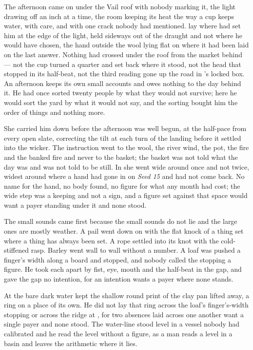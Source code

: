 The afternoon came on under the Vail roof with nobody marking it, the light drawing off  an inch at a time, the room keeping its heat the way a cup keeps water, with care, and with one crack nobody had mentioned.  lay where  had set him at the edge of the light, held sideways out of the draught and not where he would have chosen, the hand outside the wool lying flat on  where it had been laid on the last answer. Nothing had crossed under the roof from the market behind --- not the cup turned a quarter and set back where it stood, not the head that stopped in its half-beat, not the third reading gone up the road in 's locked box. An afternoon keeps its own small accounts and owes nothing to the day behind it. He had once sorted twenty people by what they would not survive; here he would sort the yard by what it would not say, and the sorting bought him the order of things and nothing more.

She carried him down before the afternoon was well begun,  at the half-pace from every open slate, correcting the tilt at each turn of the landing before it settled into the wicker. The instruction went to the wool, the river wind, the pot, the fire and the banked fire and never to the basket; the basket was not told what the day was and was not told to be still. In  she went wide around  once and not twice, widest around  where a hand had gone in on \emph{Seed 15} and had not come back. No name for the hand, no body found, no figure for what any month had cost; the wide step was a keeping and not a sign, and a figure set against that space would want a payer standing under it and none stood.

The small sounds came first because the small sounds do not lie and the large ones are mostly weather. A pail went down on  with the flat knock of a thing set where a thing has always been set. A rope settled into its knot with the cold-stiffened rasp. Barley went wall to wall without a number. A loaf was pushed a finger's width along a board and stopped, and nobody called the stopping a figure. He took each apart by fist, eye, mouth and the half-beat in the gap, and gave the gap no intention, for an intention wants a payer where none stands.

At  the bare dark water kept the shallow round print of the clay pan lifted away, a ring on a place of its own. He did not lay that ring across the loaf's finger's-width stopping or across the ridge at , for two absences laid across one another want a single payer and none stood. The water-line stood level in a vessel nobody had calibrated and he read the level without a figure, as a man reads a level in a basin and leaves the arithmetic where it lies.

